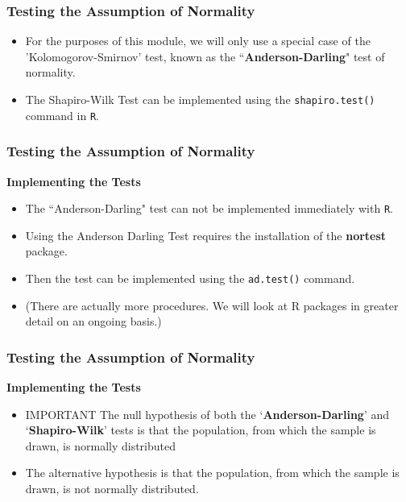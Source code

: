 \documentclass{beamer}
\begin{document}
	
	\begin{frame}
		\frametitle{Testing the Assumption of Normality}
		\Large
		\begin{itemize}
	\item	For the purposes of this module, we will only use a special case of the 'Kolomogorov-Smirnov' test, known as the ``\textbf{Anderson-Darling}" test of normality.
	\item The Shapiro-Wilk Test can be implemented using the \texttt{shapiro.test()} command in \texttt{R}.
	\end{itemize}
\end{frame}


\begin{frame}
	\frametitle{Testing the Assumption of Normality}
	\Large	
	\textbf{Implementing the Tests}
	\begin{itemize}	\item	The ``Anderson-Darling" test can not be implemented immediately with \texttt{R}. 

			\item Using the Anderson Darling Test requires the installation of the \textbf{nortest} package. 
			\item Then the test can be implemented using the \texttt{ad.test()} command.
			\item (There are actually more procedures. We will look at R packages in greater detail on an ongoing basis.)
	\end{itemize}
\end{frame}


\begin{frame}
	\frametitle{Testing the Assumption of Normality}
	\Large	
	\textbf{Implementing the Tests}
	\begin{itemize}
					\item	\alert{IMPORTANT} The null hypothesis of both the `\textbf{Anderson-Darling}’ and `\textbf{Shapiro-Wilk}’ tests is that the population, from which the sample is drawn, is normally distributed 
			\item The alternative hypothesis is that the population, from which the sample is drawn, is not normally distributed.
			
			\end{itemize}
			
		\end{frame}
				
\end{document}

